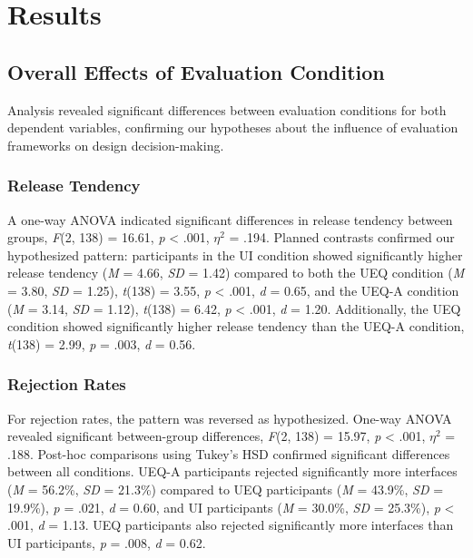 
\section{Results}

\subsection{Overall Effects of Evaluation Condition}

Analysis revealed significant differences between evaluation conditions for both dependent variables, confirming our hypotheses about the influence of evaluation frameworks on design decision-making.

\subsubsection{Release Tendency}

A one-way ANOVA indicated significant differences in release tendency between groups, \textit{F}(2, 138) = 16.61, \textit{p} < .001, $\eta^2$ = .194. Planned contrasts confirmed our hypothesized pattern: participants in the UI condition showed significantly higher release tendency (\textit{M} = 4.66, \textit{SD} = 1.42) compared to both the UEQ condition (\textit{M} = 3.80, \textit{SD} = 1.25), \textit{t}(138) = 3.55, \textit{p} < .001, \textit{d} = 0.65, and the UEQ-A condition (\textit{M} = 3.14, \textit{SD} = 1.12), \textit{t}(138) = 6.42, \textit{p} < .001, \textit{d} = 1.20. Additionally, the UEQ condition showed significantly higher release tendency than the UEQ-A condition, \textit{t}(138) = 2.99, \textit{p} = .003, \textit{d} = 0.56.

\subsubsection{Rejection Rates}

For rejection rates, the pattern was reversed as hypothesized. One-way ANOVA revealed significant between-group differences, \textit{F}(2, 138) = 15.97, \textit{p} < .001, $\eta^2$ = .188. Post-hoc comparisons using Tukey's HSD confirmed significant differences between all conditions. UEQ-A participants rejected significantly more interfaces (\textit{M} = 56.2\%, \textit{SD} = 21.3\%) compared to UEQ participants (\textit{M} = 43.9\%, \textit{SD} = 19.9\%), \textit{p} = .021, \textit{d} = 0.60, and UI participants (\textit{M} = 30.0\%, \textit{SD} = 25.3\%), \textit{p} < .001, \textit{d} = 1.13. UEQ participants also rejected significantly more interfaces than UI participants, \textit{p} = .008, \textit{d} = 0.62.

